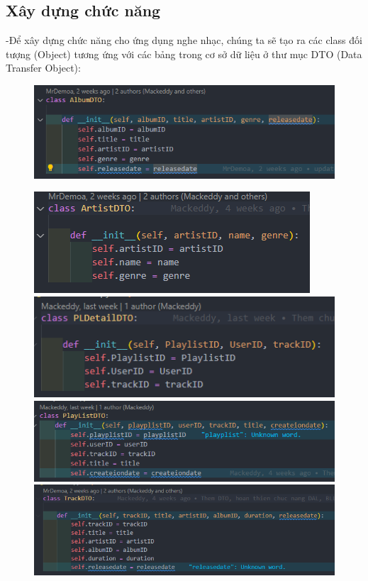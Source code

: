 \documentclass[a4paper]{article}
\begin{document}
\subsection{Xây dựng chức năng}
\begin{flushleft}
	-Để xây dựng chức năng cho ứng dụng nghe nhạc, chúng ta sẽ tạo ra các class đối tượng (Object) tương ứng với các bảng trong cơ sở dữ liệu ở thư mục DTO (Data Transfer Object):
	\begin{figure}[h]
		\centering
		\includegraphics[width=\textwidth]{images/AlbumDTO.png}
	\end{figure}
\end{flushleft}
\begin{flushleft}
	\begin{figure}[h]
		\includegraphics[width=\textwidth]{images/ArtistDTO.png}
		\includegraphics[width=\textwidth]{images/PlayListDetailDTO.png}
		\includegraphics[width=\textwidth]{images/PlayListDTO.png}
		\includegraphics[width=\textwidth]{images/TrackDTO.png}
	\end{figure}
\end{flushleft}
\clearpage
\end{document}

